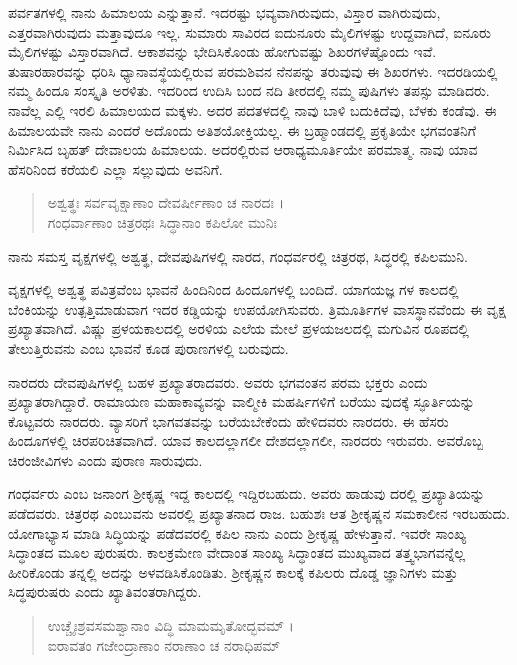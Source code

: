 ಪರ್ವತಗಳಲ್ಲಿ ನಾನು ಹಿಮಾಲಯ ಎನ್ನುತ್ತಾನೆ. ಇದರಷ್ಟು ಭವ್ಯವಾಗಿರುವುದು, ವಿಸ್ತಾರ ವಾಗಿರುವುದು, ಎತ್ತರವಾಗಿರುವುದು ಮತ್ತಾವುದೂ ಇಲ್ಲ. ಸುಮಾರು ಸಾವಿರದ ಐದುನೂರು ಮೈಲಿಗಳಷ್ಟು ಉದ್ದವಾಗಿದೆ, ಐನೂರು ಮೈಲಿಗಳಷ್ಟು ವಿಸ್ತಾರವಾಗಿದೆ. ಆಕಾಶವನ್ನು ಭೇದಿಸಿಕೊಂಡು ಹೋಗುವಷ್ಟು ಶಿಖರಗಳೆಷ್ಟೊಂದು ಇವೆ. ತುಷಾರಹಾರವನ್ನು ಧರಿಸಿ ಧ್ಯಾನಾವಸ್ಥೆಯಲ್ಲಿರುವ ಪರಮಶಿವನ ನೆನಪನ್ನು ತರುವುವು ಈ ಶಿಖರಗಳು. ಇದರಡಿಯಲ್ಲಿ ನಮ್ಮ ಹಿಂದೂ ಸಂಸ್ಕೃತಿ ಅರಳಿತು. ಇದರಿಂದ ಉದಿಸಿ ಬಂದ ನದಿ ತೀರದಲ್ಲಿ ನಮ್ಮ ಪುಷಿಗಳು ತಪಸ್ಸು ಮಾಡಿದರು. ನಾವೆಲ್ಲ ಎಲ್ಲಿ ಇರಲಿ ಹಿಮಾಲಯದ ಮಕ್ಕಳು. ಅದರ ಪದತಳದಲ್ಲಿ ನಾವು ಬಾಳಿ ಬದುಕಿದೆವು, ಬೆಳಕು ಕಂಡೆವು. ಈ ಹಿಮಾಲಯವೇ ನಾನು ಎಂದರೆ ಅದೊಂದು ಅತಿಶಯೋಕ್ತಿಯಲ್ಲ. ಈ ಬ್ರಹ್ಮಾಂಡದಲ್ಲಿ ಪ್ರಕೃತಿಯೇ ಭಗವಂತನಿಗೆ ನಿರ್ಮಿಸಿದ ಬೃಹತ್ ದೇವಾಲಯ ಹಿಮಾಲಯ. ಅದರಲ್ಲಿರುವ ಆರಾಧ್ಯಮೂರ್ತಿಯೇ ಪರಮಾತ್ಮ. ನಾವು ಯಾವ ಹೆಸರಿನಿಂದ ಕರೆಯಲಿ ಎಲ್ಲಾ ಸಲ್ಲುವುದು ಅವನಿಗೆ.

\begin{verse}
ಅಶ್ವತ್ಥಃ ಸರ್ವವೃಕ್ಷಾಣಾಂ ದೇವರ್ಷೀಣಾಂ ಚ ನಾರದಃ ।\\ಗಂಧರ್ವಾಣಾಂ ಚಿತ್ರರಥಃ ಸಿದ್ಧಾನಾಂ ಕಪಿಲೋ ಮುನಿಃ 
\end{verse}

{\small ನಾನು ಸಮಸ್ತ ವೃಕ್ಷಗಳಲ್ಲಿ ಅಶ್ವತ್ಥ, ದೇವಪುಷಿಗಳಲ್ಲಿ ನಾರದ, ಗಂಧರ್ವರಲ್ಲಿ ಚಿತ್ರರಥ, ಸಿದ್ಧರಲ್ಲಿ ಕಪಿಲಮುನಿ.}

ವೃಕ್ಷಗಳಲ್ಲಿ ಅಶ್ವತ್ಥ ಪವಿತ್ರವೆಂಬ ಭಾವನೆ ಹಿಂದಿನಿಂದ ಹಿಂದೂಗಳಲ್ಲಿ ಬಂದಿದೆ. ಯಾಗಯಜ್ಞ ಗಳ ಕಾಲದಲ್ಲಿ ಬೆಂಕಿಯನ್ನು ಉತ್ಪತ್ತಿಮಾಡುವಾಗ ಇದರ ಕಡ್ಡಿಯನ್ನು ಉಪಯೋಗಿಸುವರು. ತ್ರಿಮೂರ್ತಿಗಳ ವಾಸಸ್ಥಾನವೆಂದು ಈ ವೃಕ್ಷ ಪ್ರಖ್ಯಾತವಾಗಿದೆ. ವಿಷ್ಣು ಪ್ರಳಯಕಾಲದಲ್ಲಿ ಅರಳಿಯ ಎಲೆಯ ಮೇಲೆ ಪ್ರಳಯಜಲದಲ್ಲಿ ಮಗುವಿನ ರೂಪದಲ್ಲಿ ತೇಲುತ್ತಿರುವನು ಎಂಬ ಭಾವನೆ ಕೂಡ ಪುರಾಣಗಳಲ್ಲಿ ಬರುವುದು.

ನಾರದರು ದೇವಪುಷಿಗಳಲ್ಲಿ ಬಹಳ ಪ್ರಖ್ಯಾತರಾದವರು. ಅವರು ಭಗವಂತನ ಪರಮ ಭಕ್ತರು ಎಂದು ಪ್ರಖ್ಯಾತರಾಗಿದ್ದಾರೆ. ರಾಮಾಯಣ ಮಹಾಕಾವ್ಯವನ್ನು ವಾಲ್ಮೀಕಿ ಮಹರ್ಷಿಗಳಿಗೆ ಬರೆಯು ವುದಕ್ಕೆ ಸ್ಫೂರ್ತಿಯನ್ನು ಕೊಟ್ಟವರು ನಾರದರು. ವ್ಯಾಸರಿಗೆ ಭಾಗವತವನ್ನು ಬರೆಯಬೇಕೆಂದು ಹೇಳಿದವರು ನಾರದರು. ಈ ಹೆಸರು ಹಿಂದೂಗಳಲ್ಲಿ ಚಿರಪರಿಚಿತವಾಗಿದೆ. ಯಾವ ಕಾಲದಲ್ಲಾಗಲೀ ದೇಶದಲ್ಲಾಗಲೀ, ನಾರದರು ಇರುವರು. ಅವರೊಬ್ಬ ಚಿರಂಜೀವಿಗಳು ಎಂದು ಪುರಾಣ ಸಾರುವುದು.

ಗಂಧರ್ವರು ಎಂಬ ಜನಾಂಗ ಶ್ರೀಕೃಷ್ಣ ಇದ್ದ ಕಾಲದಲ್ಲಿ ಇದ್ದಿರಬಹುದು. ಅವರು ಹಾಡುವು ದರಲ್ಲಿ ಪ್ರಖ್ಯಾತಿಯನ್ನು ಪಡೆದವರು. ಚಿತ್ರರಥ ಎಂಬುವನು ಅವರಲ್ಲಿ ಪ್ರಖ್ಯಾತನಾದ ರಾಜ. ಬಹುಶಃ ಆತ ಶ್ರೀಕೃಷ್ಣನ ಸಮಕಾಲೀನ ಇರಬಹುದು. ಯೋಗಾಭ್ಯಾಸ ಮಾಡಿ ಸಿದ್ಧಿಯನ್ನು ಪಡೆದವರಲ್ಲಿ ಕಪಿಲ ನಾನು ಎಂದು ಶ್ರೀಕೃಷ್ಣ ಹೇಳುತ್ತಾನೆ. ಇವರೇ ಸಾಂಖ್ಯ ಸಿದ್ಧಾಂತದ ಮೂಲ ಪುರುಷರು. ಕಾಲಕ್ರಮೇಣ ವೇದಾಂತ ಸಾಂಖ್ಯ ಸಿದ್ಧಾಂತದ ಮುಖ್ಯವಾದ ತತ್ತ್ವಭಾಗವನ್ನೆಲ್ಲ ಹೀರಿಕೊಂಡು ತನ್ನಲ್ಲಿ ಅದನ್ನು ಅಳವಡಿಸಿಕೊಂಡಿತು. ಶ್ರೀಕೃಷ್ಣನ ಕಾಲಕ್ಕೆ ಕಪಿಲರು ದೊಡ್ಡ ಜ್ಞಾನಿಗಳು ಮತ್ತು ಸಿದ್ಧಪುರುಷರು ಎಂದು ಖ್ಯಾತಿವಂತರಾಗಿದ್ದರು.

\begin{verse}
ಉಚ್ಚೈಃಶ್ರವಸಮಶ್ವಾನಾಂ ವಿದ್ಧಿ ಮಾಮಮೃತೋದ್ಭವಮ್ ।\\ಐರಾವತಂ ಗಜೇಂದ್ರಾಣಾಂ ನರಾಣಾಂ ಚ ನರಾಧಿಪಮ್ 
\end{verse}

